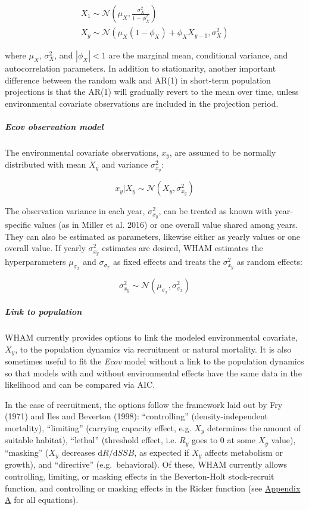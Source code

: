 \documentclass[]{article}
\let\oldsubparagraph\subparagraph
\renewcommand{\subparagraph}[1]{\oldsubparagraph{#1}\mbox{}}
\begin{document}
\begin{equation}
  \begin{array}{cc}
    X_1 \sim \mathcal{N} \left( \mu_X, \frac{\sigma^2_X}{1-\phi^2_X} \right) \\
    X_y \sim \mathcal{N} \left( \mu_X(1-\phi_X) + \phi_X X_{y-1}, \sigma^2_X \right)
  \end{array}
\end{equation}

where \(\mu_X\), \(\sigma^2_X\), and \(|\phi_X| < 1\) are the marginal
mean, conditional variance, and autocorrelation parameters. In addition
to stationarity, another important difference between the random walk
and AR(1) in short-term population projections is that the AR(1) will
gradually revert to the mean over time, unless environmental covariate
observations are included in the projection period.

\hypertarget{ecov-observation-model}{%
\subparagraph{\texorpdfstring{\emph{Ecov} observation
model}{Ecov observation model}}\label{ecov-observation-model}}

The environmental covariate observations, \(x_y\), are assumed to be
normally distributed with mean \(X_y\) and variance \(\sigma^2_{x_y}\):

\[x_y | X_y \sim \mathcal{N}\left( X_y, \sigma^2_{x_y} \right)\]

The observation variance in each year, \(\sigma^2_{x_y}\), can be
treated as known with year-specific values (as in Miller et al. 2016) or
one overall value shared among years. They can also be estimated as
parameters, likewise either as yearly values or one overall value. If
yearly \(\sigma^2_{x_y}\) estimates are desired, WHAM estimates the
hyperparameters \(\mu_{\sigma_x}\) and \(\sigma_{\sigma_x}\) as fixed
effects and treats the \(\sigma^2_{x_y}\) as random effects:

\[\sigma^2_{x_y} \sim \mathcal{N} \left( \mu_{\sigma_x}, \sigma^2_{\sigma_x} \right)\]

\hypertarget{link-to-population}{%
\subparagraph{Link to population}\label{link-to-population}}

WHAM currently provides options to link the modeled environmental
covariate, \(X_y\), to the population dynamics via recruitment or
natural mortality. It is also sometimes useful to fit the \emph{Ecov}
model without a link to the population dynamics so that models with and
without environmental effects have the same data in the likelihood and
can be compared via AIC.

In the case of recruitment, the options follow the framework laid out by
Fry (1971) and Iles and Beverton (1998): ``controlling''
(density-independent mortality), ``limiting'' (carrying capacity effect,
e.g. \(X_y\) determines the amount of suitable habitat), ``lethal''
(threshold effect, i.e. \(R_y\) goes to 0 at some \(X_y\) value),
``masking'' (\(X_y\) decreases \(\text{d}R/\text{d}SSB\), as expected if
\(X_y\) affects metabolism or growth), and ``directive''
(e.g.~behavioral). Of these, WHAM currently allows controlling,
limiting, or masking effects in the Beverton-Holt stock-recruit
function, and controlling or masking effects in the Ricker function (see
\protect\hyperlink{appendix-a}{Appendix A} for all equations).
\end{document}
